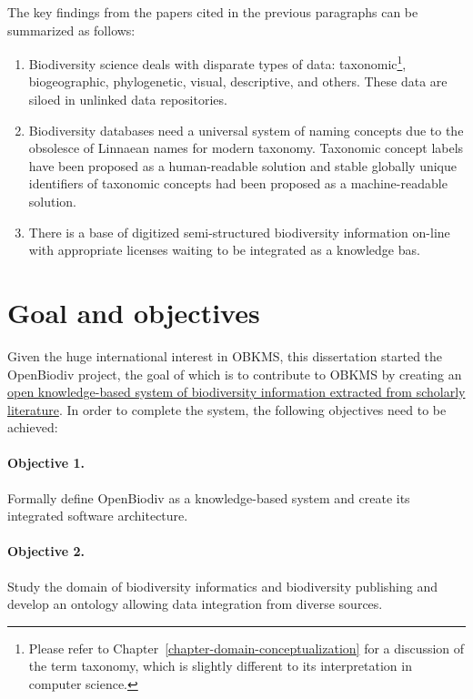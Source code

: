 The key findings from the papers cited in the previous paragraphs can be summarized as follows:

\begin{enumerate}
  
\item{Biodiversity science deals with disparate types of data: taxonomic\footnote{Please refer to Chapter~\ref{chapter-domain-conceptualization} for a discussion of the term taxonomy, which is slightly different to its interpretation in computer science.}, biogeographic, phylogenetic, visual, descriptive, and others. These data are siloed in unlinked data repositories.}
  
\item{Biodiversity databases need a universal system of naming concepts due to the obsolesce of Linnaean names for modern taxonomy. Taxonomic concept labels have been proposed as a human-readable solution and stable globally unique identifiers of taxonomic concepts had been proposed as a machine-readable solution.}

\item{There is a base of digitized semi-structured biodiversity information on-line with appropriate licenses waiting to be integrated as a knowledge bas.}
\end{enumerate}


\section*{Goal and objectives}

Given the huge international interest in OBKMS, this dissertation started the OpenBiodiv project, the goal of which is to contribute to OBKMS by creating an \ul{open knowledge-based system of biodiversity information extracted from scholarly literature}. In order to complete the system, the following objectives need to be achieved:

\paragraph{Objective 1.} Formally define OpenBiodiv as a knowledge-based system and create its integrated software architecture.
\paragraph{Objective 2.} Study the domain of biodiversity informatics and biodiversity publishing and develop an ontology allowing data integration from diverse sources.
